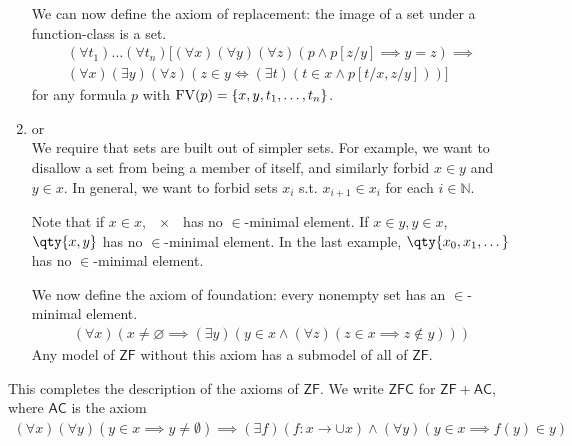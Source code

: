 \begin{enumerate}
    We can now define the axiom of replacement: the image of a set under a function-class is a set.
    \begin{align*}
        (\forall t_1)\dots(\forall t_n)[(\forall x)(\forall y)(\forall z)(p \wedge p[z/y] \implies y = z) \implies \\
        (\forall x)(\exists y)(\forall z)(z \in y \Leftrightarrow (\exists t)(t \in x \wedge p[t/x, z/y]))]
    \end{align*}
    for any formula $p$ with $\operatorname{FV}(p) = \{x, y, t_1, \dots, t_n\}$.


    \item {} or  \\
    We require that sets are built out of simpler sets.
    For example, we want to disallow a set from being a member of itself, and similarly forbid $x \in y$ and $y \in x$.
    In general, we want to forbid sets $x_i$ s.t. $x_{i+1} \in x_i$ for each $i \in \mathbb N$.

    Note that if $x \in x$, $\qty{x}$ has no $\in$-minimal element.
    If $x \in y, y \in x$, $\qty{x, y}$ has no $\in$-minimal element.
    In the last example, $\qty{x_0, x_1, \dots}$ has no $\in$-minimal element.

    We now define the axiom of foundation: every nonempty set has an $\in$-minimal element.
    \begin{align*}
        (\forall x)(x \neq \varnothing \implies (\exists y)(y \in x \wedge (\forall z)(z \in x \implies z \not\in y)))
    \end{align*}
    Any model of $\mathsf{ZF}$ without this axiom has a submodel of all of $\mathsf{ZF}$.
\end{enumerate}

This completes the description of the axioms of $\mathsf{ZF}$.
We write $\mathsf{ZFC}$ for $\mathsf{ZF} + \mathsf{AC}$, where $\mathsf{AC}$ is the axiom
\begin{align*}
    (\forall x)(\forall y)(y \in x \implies y \neq \emptyset) \implies (\exists f)(f: x \to \cup x) \wedge (\forall y)(y \in x \implies f(y) \in y)
\end{align*}

